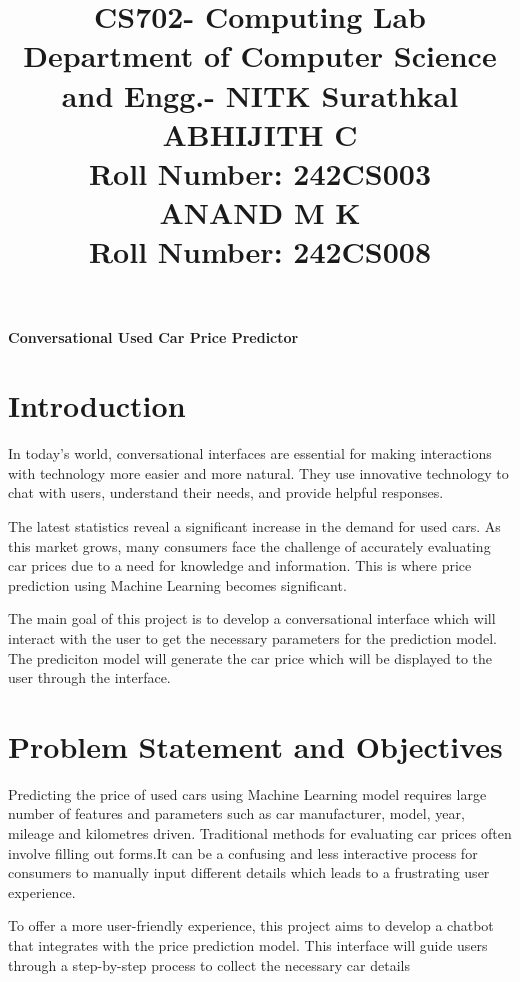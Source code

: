 \documentclass[a4paper,12pt]{article}
\title{
  \vspace{-2em} %
  \textbf{CS702- Computing Lab} \\ %
  \large \textbf{ Department of Computer Science and Engg.- NITK Surathkal} \\ %
  \vspace{1em} %
  \textbf{ABHIJITH C} \\ %
  Roll Number: 242CS003 \\%
  \textbf{ANAND M K} \\ %
  Roll Number: 242CS008 \\%
}
\date{} %
\begin{document}
\maketitle

\begin{titlepage}
\begin{center}

    \vspace*{0.1in}

    {\Huge\bfseries Conversational Used Car Price Predictor\par}
    \vspace{1in}
\end{center}

\section*{Introduction}
\begin{justify}
In today’s world, conversational interfaces are essential for making interactions with technology more easier and more natural. They use innovative technology to chat with users, understand their needs, and provide helpful responses. 
\newline

The latest statistics reveal a significant increase in the demand for used cars. As this market grows, many consumers face the challenge of accurately evaluating car prices due to a need for knowledge and information. This is where price prediction using Machine Learning  becomes significant. 
\newline

The main goal of this project is to develop a conversational interface which will interact with the user to get the necessary parameters for the prediction model. The prediciton model will generate the car price which will be displayed to the user through the interface.
\newline


\end{justify}

\section*{Problem Statement and Objectives}
\begin{justify}
Predicting the price of used cars using Machine Learning model requires large number of features and parameters such as car manufacturer, model, year, mileage and kilometres driven. Traditional methods for evaluating car prices often involve filling out forms.It can be a confusing and less interactive process for consumers to manually input different details which leads to a frustrating user experience. 
\newline

To offer a more user-friendly experience, this project aims to develop a chatbot that integrates with the price prediction model. This interface will guide users through a step-by-step process to collect the necessary car details


\end{justify}

\end{titlepage}
\end{document}

